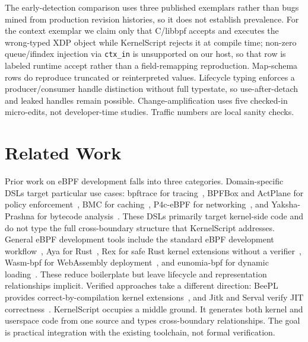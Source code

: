 \documentclass[sigplan,10pt,nonacm]{acmart}
\newcommand{\tool}{KernelScript}
\newcommand{\code}[1]{\texttt{\detokenize{#1}}}
\begin{document}
The early-detection comparison uses three published exemplars rather than bugs mined from production revision histories, so it does not establish prevalence. For the context exemplar we claim only that C/libbpf accepts and executes the wrong-typed XDP object while \tool{} rejects it at compile time; non-zero queue/ifindex injection via \code{BPF_PROG_TEST_RUN} \texttt{ctx\_in} is unsupported on our host, so that row is labeled runtime accept rather than a field-remapping reproduction. Map-schema rows do reproduce truncated or reinterpreted values. Lifecycle typing enforces a producer/consumer handle distinction without full typestate, so use-after-detach and leaked handles remain possible. Change-amplification uses five checked-in micro-edits, not developer-time studies. Traffic numbers are local sanity checks.

\section{Related Work}

Prior work on eBPF development falls into three categories.
Domain-specific DSLs target particular use cases: bpftrace for tracing~\cite{bpftrace}, BPFBox and ActPlane for policy enforcement~\cite{bpfbox,actplane}, BMC for caching~\cite{bmc}, P4c-eBPF for networking~\cite{p4c-ebpf}, and Yaksha-Prashna for bytecode analysis~\cite{yaksha}.
These DSLs primarily target kernel-side code and do not type the full cross-boundary structure that \tool{} addresses.
General eBPF development tools include the standard eBPF development workflow~\cite{libbpf}, Aya for Rust~\cite{aya}, Rex for safe Rust kernel extensions without a verifier~\cite{rex}, Wasm-bpf for WebAssembly deployment~\cite{wasmbpf}, and eunomia-bpf for dynamic loading~\cite{eunomia-bpf}.
These reduce boilerplate but leave lifecycle and representation relationships implicit.
Verified approaches take a different direction: BeePL provides correct-by-compilation kernel extensions~\cite{beepl}, and Jitk and Serval verify JIT correctness~\cite{jitk,serval}.
\tool{} occupies a middle ground. It generates both kernel and userspace code from one source and types cross-boundary relationships. The goal is practical integration with the existing toolchain, not formal verification.
\end{document}
